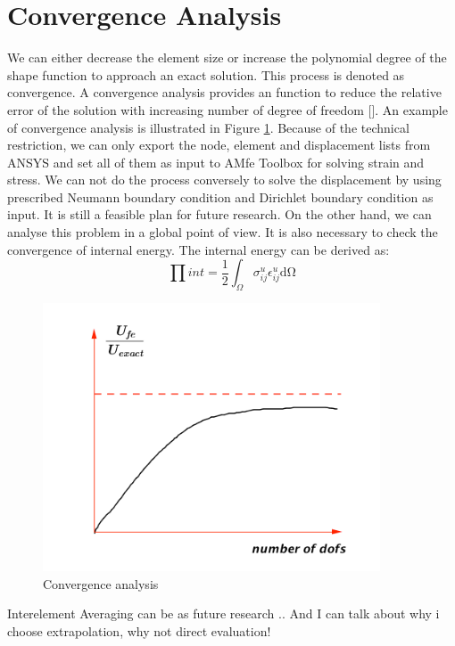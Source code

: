 \section{Convergence Analysis}
We can either decrease the element size or increase the polynomial degree of the shape function to approach an exact solution. This process is denoted as convergence. A convergence analysis provides an function to reduce the relative error of the solution with increasing number of degree of freedom [\cite{FiniteElement}]. An example of convergence analysis is illustrated in Figure \ref{fig: convergence}. Because of the technical restriction, we can only export the node, element and displacement lists from ANSYS and set all of them as input to AMfe Toolbox for solving strain and stress. We can not do the process conversely to solve the displacement by using prescribed Neumann boundary condition and Dirichlet boundary condition as input. It is still a feasible plan for future research. On the other hand, we can analyse this problem in a global point of view. It is also necessary to check the convergence of internal energy. The internal energy can be derived as:
\begin{equation}
\prod int = \frac{1}{2}\int_\Omega \sigma_{ij}^u\epsilon_{ij}^u \mathrm{d \Omega}
\end{equation}

\begin{figure}[htbp]
	\begin{center}	
		\includegraphics[width=10cm,clip]{convergence.pdf} 			
		\caption{Convergence analysis} \label{fig: convergence}
	\end{center}
\end{figure}

\cite[p. 18]{bibid}
Interelement Averaging can be as future research ..
And I can talk about why i choose extrapolation, why not direct evaluation!
\cite[p. 1-10]{Johannes}